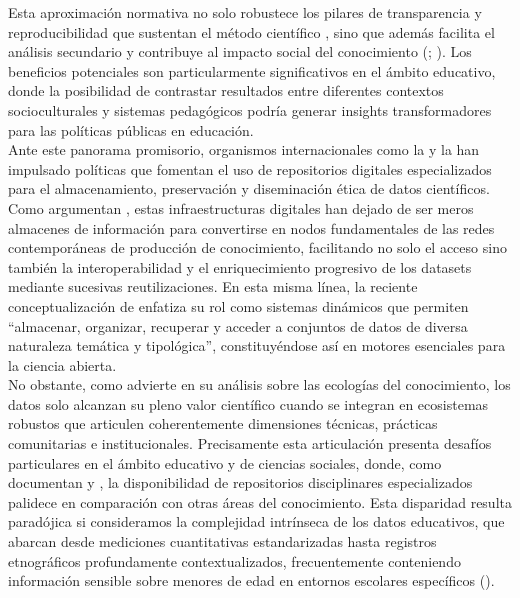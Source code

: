 \documentclass{article}
\begin{document}
Esta aproximación normativa no solo robustece los pilares de transparencia y reproducibilidad que sustentan el método científico \cite{oecd2020}, sino que además facilita el análisis secundario y contribuye al impacto social del conocimiento (\cite{ec2016}; \cite{wilkinson2016}). Los beneficios potenciales son particularmente significativos en el ámbito educativo, donde la posibilidad de contrastar resultados entre diferentes contextos socioculturales y sistemas pedagógicos podría generar insights transformadores para las políticas públicas en educación.\\

Ante este panorama promisorio, organismos internacionales como la \cite{unesco2021} y la \cite{oecd2020} han impulsado políticas que fomentan el uso de repositorios digitales especializados para el almacenamiento, preservación y diseminación ética de datos científicos. Como argumentan \cite{borgman2018}, estas infraestructuras digitales han dejado de ser meros almacenes de información para convertirse en nodos fundamentales de las redes contemporáneas de producción de conocimiento, facilitando no solo el acceso sino también la interoperabilidad y el enriquecimiento progresivo de los datasets mediante sucesivas reutilizaciones. En esta misma línea, la reciente conceptualización de \cite[p.~27]{avila2024} enfatiza su rol como sistemas dinámicos que permiten ``almacenar, organizar, recuperar y acceder a conjuntos de datos de diversa naturaleza temática y tipológica'', constituyéndose así en motores esenciales para la ciencia abierta.\\

No obstante, como advierte \cite{borgman2016} en su análisis sobre las ecologías del conocimiento, los datos solo alcanzan su pleno valor científico cuando se integran en ecosistemas robustos que articulen coherentemente dimensiones técnicas, prácticas comunitarias e institucionales. Precisamente esta articulación presenta desafíos particulares en el ámbito educativo y de ciencias sociales, donde, como documentan \cite{kraehmer2023} y \cite{gray2023}, la disponibilidad de repositorios disciplinares especializados palidece en comparación con otras áreas del conocimiento. Esta disparidad resulta paradójica si consideramos la complejidad intrínseca de los datos educativos, que abarcan desde mediciones cuantitativas estandarizadas hasta registros etnográficos profundamente contextualizados, frecuentemente conteniendo información sensible sobre menores de edad en entornos escolares específicos (\cite{gomes2022}).\\
\end{document}
